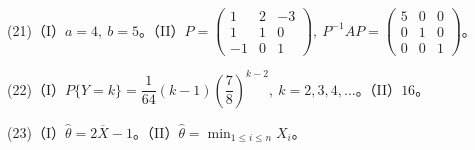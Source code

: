 \documentclass[UTF8,12pt]{ctexart}
\begin{document}
(21)（I）\(\displaystyle a=4,\allowbreak \ b=5\)。（II）\(\displaystyle P=\begin{pmatrix}1&2&-3\\1&1&0\\-1&0&1\end{pmatrix},\allowbreak \ P^{-1}AP=\begin{pmatrix}5&0&0\\0&1&0\\0&0&1\end{pmatrix}\)。


(22)（I）\(\displaystyle P\{Y=k\}=\dfrac{\displaystyle 1}{\displaystyle 64}(k-1)\left(\dfrac{\displaystyle 7}{\displaystyle 8}\right)^{k-2},\allowbreak \ k=2,\allowbreak 3,\allowbreak 4,\allowbreak \ldots\)。（II）\(\displaystyle 16\)。


(23)（I）\(\displaystyle \hat\theta=2\overline X-1\)。（II）\(\displaystyle \hat\theta=\displaystyle \min_{1\leq i\leq n}X_i\)。


\clearpage
\end{document}
